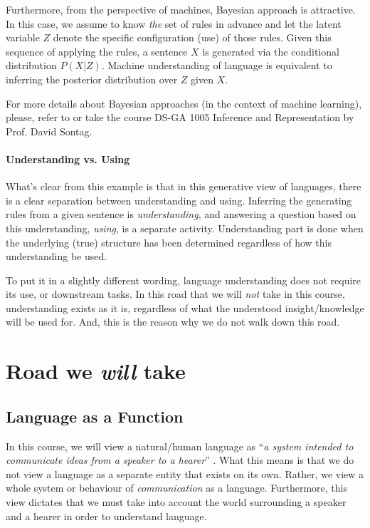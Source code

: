 \documentclass{report}
\begin{document}
Furthermore, from the perspective of machines, Bayesian approach is attractive.
In this case, we assume to know {\it the} set of rules in advance and let the
latent variable $Z$ denote the specific configuration (use) of those rules.
Given this sequence of applying the rules, a sentence $X$ is generated via the
conditional distribution $P(X|Z)$. Machine understanding of language is
equivalent to inferring the posterior distribution over $Z$ given $X$.

For more details about Bayesian approaches (in the context of machine learning),
please, refer to \cite{bishop2006pattern} or take the course DS-GA 1005
Inference and Representation by Prof. David Sontag.

\paragraph{Understanding vs. Using} 
What's clear from this example is that in this generative view of languages,
there is a clear separation between understanding and using. Inferring the
generating rules from a given sentence is {\it understanding}, and answering a
question based on this understanding, {\it using}, is a separate activity.
Understanding part is done when the underlying (true) structure has been
determined regardless of how this understanding be used.

To put it in a slightly different wording, language understanding does not
require its use, or downstream tasks. In this road that we will {\em not} take
in this course, understanding exists as it is, regardless of what the understood
insight/knowledge will be used for. And, this is the reason why we do not walk
down this road.

\section{Road we {\it will} take}

\subsection{Language as a Function}

In this course, we will view a natural/human language as ``{\it a system
intended to communicate ideas from a speaker to a hearer}''
\cite{winograd1972understanding}. What this means is that we do not view a
language as a separate entity that exists on its own. Rather, we view a whole
system or behaviour of {\it communication} as a language. Furthermore, this view
dictates that we must take into account the world surrounding a speaker and a
hearer in order to understand language.
\end{document}
